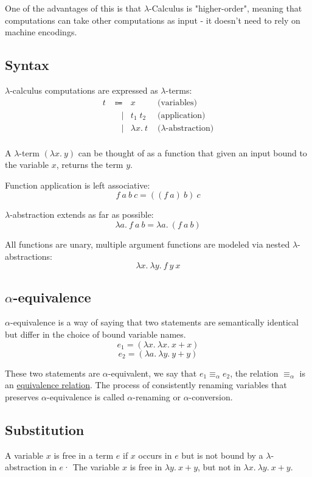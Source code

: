 \documentclass{article}
\begin{document}
One of the advantages of this is that $\lambda$-Calculus is "higher-order", meaning that computations can take other computations as input - it doesn't need to rely on machine encodings.

\subsection{Syntax}\label{lambda-term}
$\lambda$-calculus computations are expressed as $\lambda$-terms:
\begin{equation}
\begin{aligned}
    t \; & \Coloneqq & x & \text{    (variables)} \nonumber \\
       &\;\;\:|& t_1 \; t_2 & \text{    (application)} \nonumber \\
       &\;\;\:|& \lambda x.\:t & \text{    ($\lambda$-abstraction)} \nonumber \\
\end{aligned}
\end{equation}

A $\lambda$-term $(\lambda x.\:y)$ can be thought of as a function that given an input bound to the variable $x$, returns the term $y$.

Function application is left associative:
\[f\:a\:b\:c = ((f\:a)\:b)\:c\]

$\lambda$-abstraction extends as far as possible:
\[\lambda a.\:f\:a\:b = \lambda a.\:(f\:a\:b)\]

All functions are unary, multiple argument functions are modeled via nested $\lambda$-abstractions:
\[\lambda x.\:\lambda y.\:f\:y\:x\]



\subsection{$\alpha$-equivalence}\label{alpha-equivalence}\label{alpha-rename}
$\alpha$-equivalence is a way of saying that two statements are semantically identical but differ in the choice of bound variable names.
\[e_1 = (\lambda x.\:\lambda x.\:x + x)\]
\[e_2 = (\lambda a.\:\lambda y.\:y + y)\]

These two statements are $\alpha$-equivalent, we say that $e_1 \equiv_\alpha e_2$, the relation $\equiv_\alpha$ is an \hyperref[equivalence-relation]{equivalence relation}. The process of consistently renaming variables that preserves $\alpha$-equivalence is called $\alpha$-renaming or $\alpha$-conversion.

\subsection{Substitution}\label{substitution}\label{free-variables}
A variable $x$ is free in a term $e$ if $x$ occurs in $e$ but is not bound by a $\lambda$-abstraction in $e$· The variable $x$ is free in $\lambda y.\:x+y$, but not in $\lambda x.\:\lambda y.\:x+y$.
\end{document}
